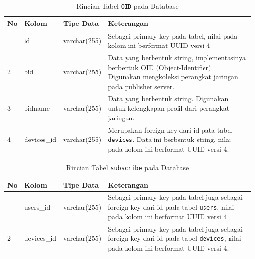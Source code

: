     	\begin{longtable}{|p{}|p{}|p{}|p{}|} %
    		
    		\caption{Rincian Tabel \texttt{OID} pada Database} \label{tabeldboid} \\
    		\hline
    		\textbf{No} & \textbf{Kolom} & \textbf{Tipe Data} & \textbf{Keterangan} \\ \hline
    		\endhead
    		\endfoot
    		\endlastfoot
    		1 & id & varchar(255) & Sebagai primary key pada tabel, nilai pada kolom ini berformat UUID versi 4 \\ \hline
    		2 & oid & varchar(255) & Data yang berbentuk string, implementasinya berbentuk OID (Object-Identifier). Digunakan mengkoleksi perangkat jaringan pada publisher server. \\ \hline
    		3 & oidname & varchar(255) & Data yang berbentuk string. Digunakan untuk kelengkapan profil dari perangkat jaringan. \\ \hline
    		4 & devices\_id & varchar(255) & Merupakan foreign key dari id pata tabel \texttt{devices}. Data ini berbentuk string, nilai pada kolom ini berformat UUID versi 4. \\ \hline
    	\end{longtable}
    
    	\begin{longtable}{|p{}|p{}|p{}|p{}|} %
    		
    		\caption{Rincian Tabel \texttt{subscribe} pada Database} \label{tabeldbsubscribe} \\
    		\hline
    		\textbf{No} & \textbf{Kolom} & \textbf{Tipe Data} & \textbf{Keterangan} \\ \hline
    		\endhead
    		\endfoot
    		\endlastfoot
    		1 & users\_id & varchar(255) & Sebagai primary key pada tabel juga sebagai foreign key dari id pada tabel \texttt{users}, nilai pada kolom ini berformat UUID versi 4 \\ \hline
    		2 & devices\_id & varchar(255) & Sebagai primary key pada tabel juga sebagai foreign key dari id pada tabel \texttt{devices}, nilai pada kolom ini berformat UUID versi 4. \\ \hline
    	\end{longtable}
    
